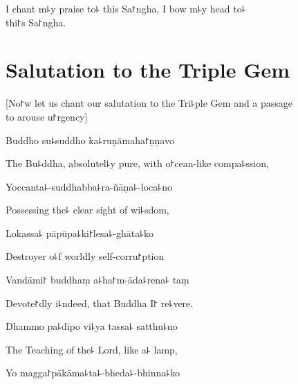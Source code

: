 \begin{english}
  I chant m꜕y praise to꜕ this Sa꜓ngha, I bow m꜕y head to꜕\\ thi꜓s Sa꜓ngha.
\end{english}

\clearpage

\chapter{Salutation to the Triple Gem}              %

\begin{leader}
\end{leader}

\begin{english}
  [No꜓w let us chant our salutation to the Tri꜕ple Gem and a passage \\to arouse u꜓rgency]
\end{english}

Buddho su꜕suddho ka꜕ruṇāmaha꜓ṇṇavo

\begin{english}
  The Bu꜕ddha, absolutel꜕y pure, with o꜓cean-like compa꜕ssion,
\end{english}

Yoccanta꜕-suddhabba꜕ra-ñāṇa꜕-loca꜕no

\begin{english}
  Possessing the꜕ clear sight of wi꜕sdom,
\end{english}

Lokassa꜕ pāpūpa꜕ki꜓lesa꜕-ghāta꜕ko

\begin{english}
  Destroyer o꜕f worldly self-corru꜓ption
\end{english}

Vandāmi꜓ buddhaṃ a꜕ha꜓m-āda꜕rena꜕ taṃ

\begin{english}
  Devote꜓dly i꜕ndeed, that Buddha I꜓ re꜕vere.
\end{english}

Dhammo pa꜕dīpo vi꜕ya tassa꜕ satthu꜕no

\begin{english}
  The Teaching of the꜕ Lord, like a꜕ lamp,
\end{english}

Yo magga꜓pākāma꜕ta꜕-bheda꜕-bhinna꜕ko

